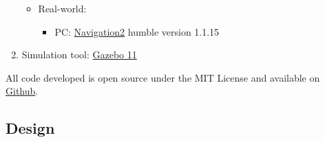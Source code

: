 \begin{enumerate}
\begin{itemize}
        \item Real-world:
        \begin{itemize}
            \item PC: \href{https://navigation.ros.org/tutorials/docs/navigation2_with_slam.html}{Navigation2}\:\cite{macenski_desks_2023}\cite{macenski_open-source_2024}\cite{macenski_regulated_2023}\cite{merzlyakov_comparison_2021}\cite{macenski_marathon_2020} humble version 1.1.15
        \end{itemize}
    \end{itemize}
    \item Simulation tool: \href{https://gazebosim.org/home}{Gazebo 11}
\end{enumerate}

All code developed is open source under the MIT License and available on \href{https://github.com/MobiBotInnovate}{Github}.


\subsection{Design}

